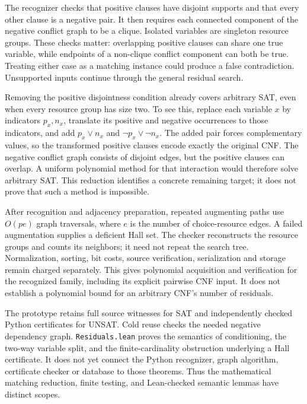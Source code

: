 \documentclass[11pt,a4paper]{article}
\numberwithin{equation}{section}
\theoremstyle{plain}
\theoremstyle{definition}
\theoremstyle{remark}
\begin{document}
The recognizer checks that positive clauses have disjoint supports and that every other clause is a negative pair. It then requires each connected component of the negative conflict graph to be a clique. Isolated variables are singleton resource groups. These checks matter: overlapping positive clauses can share one true variable, while endpoints of a non-clique conflict component can both be true. Treating either case as a matching instance could produce a false contradiction. Unsupported inputs continue through the general residual search.

Removing the positive disjointness condition already covers arbitrary SAT, even when every resource group has size two. To see this, replace each variable $x$ by indicators $p_x,n_x$, translate its positive and negative occurrences to those indicators, and add $p_x\lor n_x$ and $\neg p_x\lor\neg n_x$. The added pair forces complementary values, so the transformed positive clauses encode exactly the original CNF. The negative conflict graph consists of disjoint edges, but the positive clauses can overlap. A uniform polynomial method for that interaction would therefore solve arbitrary SAT. This reduction identifies a concrete remaining target; it does not prove that such a method is impossible.

After recognition and adjacency preparation, repeated augmenting paths use $O(pe)$ graph traversals, where $e$ is the number of choice-resource edges. A failed augmentation supplies a deficient Hall set. The checker reconstructs the resource groups and counts its neighbors; it need not repeat the search tree. Normalization, sorting, bit costs, source verification, serialization and storage remain charged separately. This gives polynomial acquisition and verification for the recognized family, including its explicit pairwise CNF input. It does not establish a polynomial bound for an arbitrary CNF's number of residuals.

The prototype retains full source witnesses for SAT and independently checked Python certificates for UNSAT. Cold reuse checks the needed negative dependency graph. \texttt{Residuals.lean} proves the semantics of conditioning, the two-way variable split, and the finite-cardinality obstruction underlying a Hall certificate. It does not yet connect the Python recognizer, graph algorithm, certificate checker or database to those theorems. Thus the mathematical matching reduction, finite testing, and Lean-checked semantic lemmas have distinct scopes.
\end{document}
